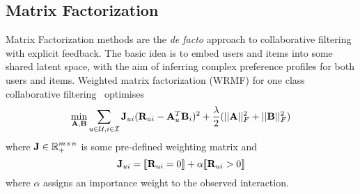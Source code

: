 \subsection{Matrix Factorization}

Matrix Factorization methods are the \emph{de facto} approach to collaborative filtering with explicit feedback. The basic idea is to embed users and items into some shared latent space, with the aim of inferring complex preference profiles for both users and items. 
Weighted matrix factorization (WRMF) for one class collaborative filtering~\cite{Hu:2008, Pan:2009} optimises
\begin{equation}
\label{eqn:wrmf}
\min_{ \mathbf{A},\mathbf{B}  } \sum_{ u \in \mathcal{U}, i \in \mathcal{I} } \mathbf{J}_{ui} ( \mathbf{R}_{ui} - \mathbf{A}_u^T \mathbf{B}_i )^2 + \frac{\lambda}{2}  ( ||\mathbf{A}||_F^2 + ||\mathbf{B}||_F^2 )
\end{equation}
where 
$\mathbf{J} \in \mathbb{R}_+^{m \times n}$ is some pre-defined weighting matrix  and 
\begin{equation}
\label{eqn:wrmf-weight}
\mathbf{J}_{ui} =  \llbracket  \mathbf{R}_{ui} = 0  \rrbracket + \alpha \llbracket  \mathbf{R}_{ui} > 0  \rrbracket 
\end{equation}
where $\alpha$ assigns an importance weight to the observed interaction.



